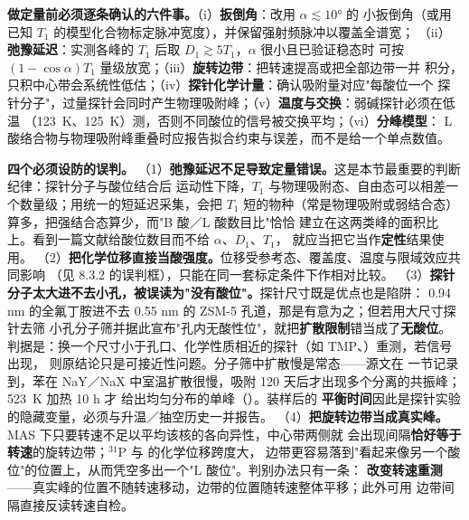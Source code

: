 \begin{measure}
\textbf{做定量前必须逐条确认的六件事。}（i）\textbf{扳倒角}：改用 $\alpha\lesssim10°$ 的
小扳倒角（或用已知 $T_1$ 的模型化合物标定脉冲宽度），并保留强射频脉冲以覆盖全谱宽；
（ii）\textbf{弛豫延迟}：实测各峰的 $T_1$ 后取 $D_1\gtrsim5T_1$，$\alpha$ 很小且已验证稳态时
可按 $(1-\cos\alpha)T_1$ 量级放宽；（iii）\textbf{旋转边带}：把转速提高或把全部边带一并
积分，只积中心带会系统性低估；（iv）\textbf{探针化学计量}：确认吸附量对应"每酸位一个
探针分子"，过量探针会同时产生物理吸附峰；（v）\textbf{温度与交换}：弱碱探针必须在低温
（\qty{123}{K}、\qty{125}{K}）测，否则不同酸位的信号被交换平均；（vi）\textbf{分峰模型}：
L 酸络合物与物理吸附峰重叠时应报告拟合约束与误差，而不是给一个单点数值。
\end{measure}

\begin{pitfall}
\textbf{四个必须设防的误判。}
（1）\textbf{弛豫延迟不足导致定量错误。}这是本节最重要的判断纪律：探针分子与酸位结合后
运动性下降，$T_1$ 与物理吸附态、自由态可以相差一个数量级；用统一的短延迟采集，会把
$T_1$ 短的物种（常是物理吸附或弱结合态）算多，把强结合态算少，而"B 酸／L 酸数目比"恰恰
建立在这两类峰的面积比上。看到一篇文献给酸位数目而不给 $\alpha$、$D_1$、$T_1$，
就应当把它当作\textbf{定性}结果使用。
（2）\textbf{把化学位移直接当酸强度。}位移受参考态、覆盖度、温度与限域效应共同影响
（见 8.3.2 的误判框），只能在同一套标定条件下作相对比较。
（3）\textbf{探针分子太大进不去小孔，被误读为"没有酸位"。}探针尺寸既是优点也是陷阱：
0.94 nm 的全氟丁胺进不去 0.55 nm 的 ZSM-5 孔道，那是有意为之；但若用大尺寸探针去筛
小孔分子筛并据此宣布"孔内无酸性位"，就把\textbf{扩散限制}错当成了\textbf{无酸位}。
判据是：换一个尺寸小于孔口、化学性质相近的探针（如 TMP、）重测，若信号出现，
则原结论只是可接近性问题。分子筛中扩散慢是常态——源文在  一节记录到，苯在
NaY／NaX 中室温扩散很慢，吸附 120 天后才出现多个分离的共振峰；\qty{523}{K} 加热 10 h 才
给出均匀分布的单峰（）。装样后的
\textbf{平衡时间}因此是探针实验的隐藏变量，必须与升温／抽空历史一并报告。
（4）\textbf{把旋转边带当成真实峰。}MAS 下只要转速不足以平均该核的各向异性，中心带两侧就
会出现间隔\textbf{恰好等于转速}的旋转边带；$^{31}$P 与  的化学位移跨度大，
边带更容易落到"看起来像另一个酸位"的位置上，从而凭空多出一个"L 酸位"。判别办法只有一条：
\textbf{改变转速重测}——真实峰的位置不随转速移动，边带的位置随转速整体平移；此外可用
边带间隔直接反读转速自检。
\end{pitfall}

